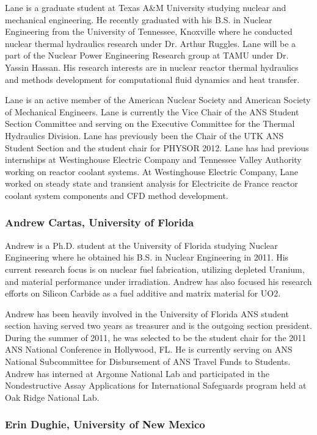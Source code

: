 Lane is a graduate student at Texas A\&M University studying nuclear and
mechanical engineering. He recently graduated with his B.S. in Nuclear
Engineering from the University of Tennessee, Knoxville where he conducted
nuclear thermal hydraulics research under Dr. Arthur Ruggles. Lane will be a
part of the Nuclear Power Engineering Research group at TAMU under Dr. Yassin
Hassan. His research interests are in nuclear reactor thermal hydraulics and
methods development for computational fluid dynamics and heat transfer.

Lane is an active member of the American Nuclear Society and American Society of
Mechanical Engineers. Lane is currently the Vice Chair of the ANS Student
Section Committee and serving on the Executive Committee for the Thermal
Hydraulics Division. Lane has previously been the Chair of the UTK ANS Student
Section and the student chair for PHYSOR 2012. Lane has had previous internships
at Westinghouse Electric Company and Tennessee Valley Authority working on
reactor coolant systems. At Westinghouse Electric Company, Lane worked on steady
state and transient analysis for Electricite de France reactor coolant system
components and CFD method development.

\subsubsection*{Andrew Cartas, University of Florida}

Andrew is a Ph.D. student at the University of Florida studying Nuclear
Engineering where he obtained his B.S. in Nuclear Engineering in 2011. His
current research focus is on nuclear fuel fabrication, utilizing depleted
Uranium, and material performance under irradiation. Andrew has also focused his
research efforts on Silicon Carbide as a fuel additive and matrix material for
UO2.

Andrew has been heavily involved in the University of Florida ANS student
section having served two years as treasurer and is the outgoing section
president. During the summer of 2011, he was selected to be the student chair
for the 2011 ANS National Conference in Hollywood, FL. He is currently serving
on ANS National Subcommittee for Disbursement of ANS Travel Funds to
Students. Andrew has interned at Argonne National Lab and participated in the
Nondestructive Assay Applications for International Safeguards program held at
Oak Ridge National Lab.

\subsubsection*{Erin Dughie, University of New Mexico}

